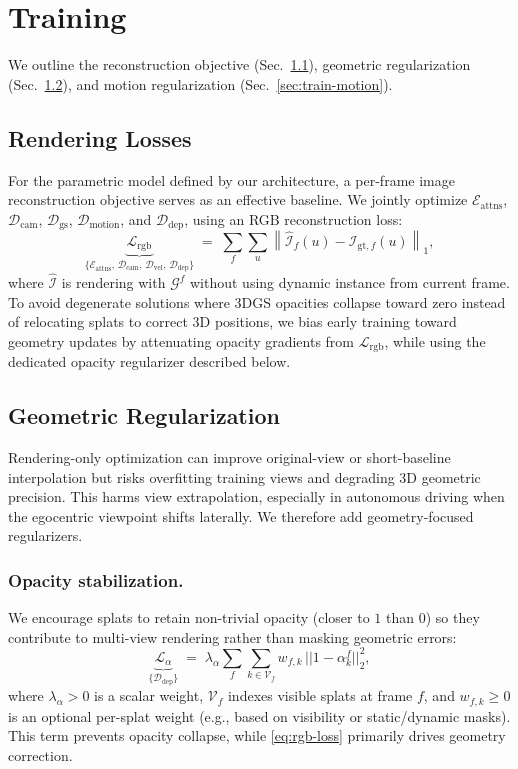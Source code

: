 \section{Training}\label{sec:train}
We outline the reconstruction objective (Sec.~\ref{sec:train-radiance}), geometric regularization (Sec.~\ref{sec:train-geom}), and motion regularization (Sec.~\ref{sec:train-motion}).

\subsection{Rendering Losses}\label{sec:train-radiance}
For the parametric model defined by our architecture, a per-frame image reconstruction objective serves as an effective baseline. 
We jointly optimize $\mathcal{E}_{\text{attns}}$, $\mathcal{D}_{\text{cam}}$, $\mathcal{D}_{\text{gs}}$, $\mathcal{D}_{\text{motion}}$, and $\mathcal{D}_{\text{dep}}$, using an RGB reconstruction loss:
\begin{equation}
\underbrace{\mathcal{L}_{\text{rgb}}}_{\{\mathcal{E}_{\text{attns}},\,\mathcal{D}_{\text{cam}},\,\mathcal{D}_{\text{vel}},\,\mathcal{D}_{\text{dep}}\}}
\;=\;
\sum_{f}\sum_{u}\left\|\hat{\mathcal{I}}_f(u) - \mathcal{I}_{\text{gt},f}(u)\right\|_1,
\label{eq:rgb-loss}
\end{equation}
where $\hat{\mathcal{I}}$ is rendering with $\mathcal{G}^{f}$ without using dynamic instance from current frame. To avoid degenerate solutions where 3DGS opacities collapse toward zero instead of relocating splats to correct 3D positions, we bias early training toward geometry updates by attenuating opacity gradients from $\mathcal{L}_{\text{rgb}}$, while using the dedicated opacity regularizer described below.

\subsection{Geometric Regularization}\label{sec:train-geom}
Rendering-only optimization can improve original-view or short-baseline interpolation but risks overfitting training views and degrading 3D geometric precision. This harms view extrapolation, especially in autonomous driving when the egocentric viewpoint shifts laterally. We therefore add geometry-focused regularizers.

\subsubsection{Opacity stabilization.}
We encourage splats to retain non-trivial opacity (closer to $1$ than $0$) so they contribute to multi-view rendering rather than masking geometric errors:
\begin{equation}
\underbrace{\mathcal{L}_{\alpha}}_{\{\mathcal{D}_{\text{dep}}\}}
\;=\;
\lambda_{\alpha}\sum_{f}\sum_{k\in\mathcal{V}_f}
w_{f,k}\,||1-\alpha_{k}^{f}\big||_{2}^{2},
\label{eq:alpha-loss}
\end{equation}
where $\lambda_{\alpha}>0$ is a scalar weight, $\mathcal{V}_f$ indexes visible splats at frame $f$, and $w_{f,k}\ge 0$ is an optional per-splat weight (e.g., based on visibility or static/dynamic masks). This term prevents opacity collapse, while \eqref{eq:rgb-loss} primarily drives geometry correction.

